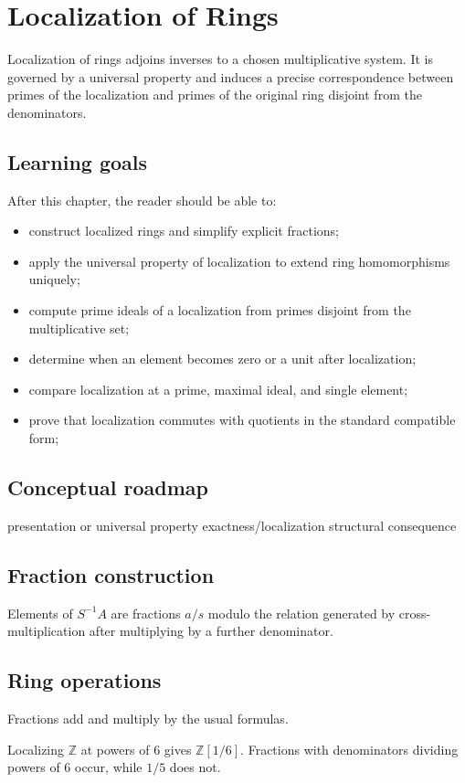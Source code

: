 \chapter{Localization of Rings}
\label{ch:v06}

Localization of rings adjoins inverses to a chosen multiplicative system. It is governed by a universal property and induces a precise correspondence between primes of the localization and primes of the original ring disjoint from the denominators.

\section*{Learning goals}
After this chapter, the reader should be able to:
\begin{itemize}
\item construct localized rings and simplify explicit fractions;
\item apply the universal property of localization to extend ring homomorphisms uniquely;
\item compute prime ideals of a localization from primes disjoint from the multiplicative set;
\item determine when an element becomes zero or a unit after localization;
\item compare localization at a prime, maximal ideal, and single element;
\item prove that localization commutes with quotients in the standard compatible form;
\end{itemize}
\section*{Conceptual roadmap}
\volroadmap
  {presentation or universal property}
  {exactness/localization}
  {structural consequence}

\section{Fraction construction}
Elements of $S^{-1}A$ are fractions $a/s$ modulo the relation generated by cross-multiplication after multiplying by a further denominator.

\section{Ring operations}
Fractions add and multiply by the usual formulas.

\begin{example}\label{ex:v06-expand-01}
Localizing $\mathbb Z$ at powers of $6$ gives $\mathbb Z[1/6]$. Fractions with denominators dividing powers of $6$ occur, while $1/5$ does not.
\end{example}
